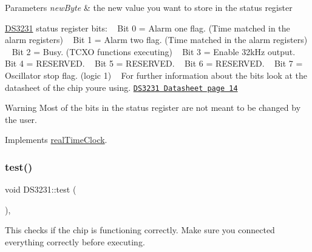 \begin{DoxyParams}{Parameters}
{\em new\+Byte} & the new value you want to store in the status register\\
\hline
\end{DoxyParams}
\mbox{\hyperlink{class_d_s3231}{D\+S3231}} status register bits\+: ~\newline
 Bit 0 = Alarm one flag. (Time matched in the alarm registers) ~\newline
 Bit 1 = Alarm two flag. (Time matched in the alarm registers) ~\newline
 Bit 2 = Busy. (T\+C\+XO functions executing) ~\newline
 Bit 3 = Enable 32k\+Hz output. ~\newline
 Bit 4 = R\+E\+S\+E\+R\+V\+ED. ~\newline
 Bit 5 = R\+E\+S\+E\+R\+V\+ED. ~\newline
 Bit 6 = R\+E\+S\+E\+R\+V\+ED. ~\newline
 Bit 7 = Oscillator stop flag. (logic 1) ~\newline
 For further information about the bits look at the datasheet of the chip you\textquotesingle{}re using. \href{https://datasheets.maximintegrated.com/en/ds/DS3231.pdf}{\tt D\+S3231 Datasheet page 14} \begin{DoxyWarning}{Warning}
Most of the bits in the status register are not meant to be changed by the user. 
\end{DoxyWarning}


Implements \mbox{\hyperlink{classreal_time_clock_aa8ee80a7056c67543834508d0f04a218}{real\+Time\+Clock}}.

\mbox{\label{class_d_s3231_aba65d7463036207d2a7c879d34dc827e}} 
\subsubsection{\texorpdfstring{test()}{test()}}
{\footnotesize\ttfamily void D\+S3231\+::test (\begin{DoxyParamCaption}{ }\end{DoxyParamCaption})\hspace{0.3cm}{\ttfamily [override]}, {\ttfamily [virtual]}}



This checks if the chip is functioning correctly. Make sure you connected everything correctly before executing. 

